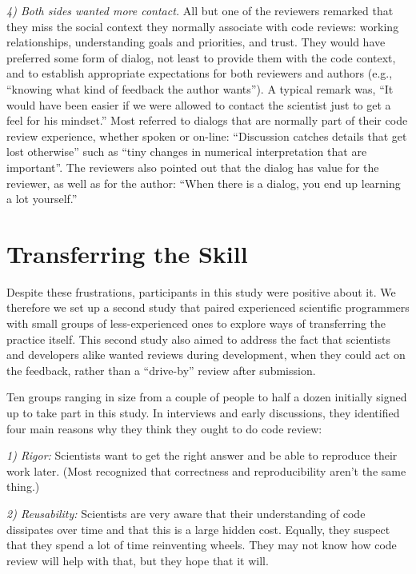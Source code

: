 \documentclass[10pt,twocolumn]{article}
\begin{document}
\noindent \emph{4) Both sides wanted more contact.}
All but one of the reviewers remarked that they miss the social context they normally associate with code reviews:
working relationships, understanding goals and priorities, and trust.
They would have preferred some form of dialog,
not least to provide them with the code context,
and to establish appropriate expectations for both reviewers and authors
(e.g., ``knowing what kind of feedback the author wants'').
A typical remark was,
``It would have been easier if we were allowed to contact the scientist just to get a feel for his mindset.''
Most referred to dialogs that are normally part of their code review experience,
whether spoken or on-line:
``Discussion catches details that get lost otherwise''
such as ``tiny changes in numerical interpretation that are important''.
The reviewers also pointed out that the dialog has value for the reviewer,
as well as for the author:
``When there is a dialog, you end up learning a lot yourself.''

\section{Transferring the Skill}

Despite these frustrations,
participants in this study were positive about it.
We therefore we set up a second study
that paired experienced scientific programmers with small groups of less-experienced ones
to explore ways of transferring the practice itself.
This second study also aimed to address the fact that
scientists and developers alike wanted reviews during development,
when they could act on the feedback,
rather than a ``drive-by'' review after submission.

Ten groups ranging in size from a couple of people to half a dozen initially signed up to take part in this study.
In interviews and early discussions,
they identified four main reasons why they think they ought to do code review:

\noindent \emph{1) Rigor:}
Scientists want to get the right answer and be able to reproduce their work later.
(Most recognized that correctness and reproducibility aren't the same thing.)

\noindent \emph{2) Reusability:}
Scientists are very aware that their understanding of code dissipates over time
and that this is a large hidden cost.
Equally, they suspect that they spend a lot of time reinventing wheels.
They may not know how code review will help with that, but they hope that it will.
\end{document}
